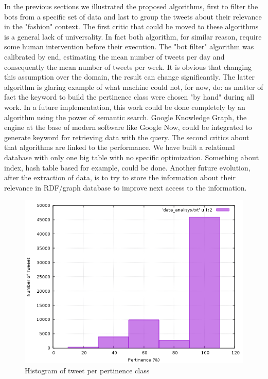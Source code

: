 \documentclass[conference, onecolumn]{IEEEtran}
\begin{document}
In the previous sections we illustrated the proposed algorithms, first to filter the bots from a specific set of data and last to group the tweets about their relevance in the "fashion" context. The first critic that could be moved to these algorithms is a general lack of universality. In fact both algorithm, for similar reason, require some human intervention before their execution. The "bot filter" algorithm was calibrated by end, estimating the mean number of tweets per day and consequently the mean number of tweets per week. It is obvious that changing this assumption over the domain, the result can change significantly. The latter algorithm is glaring example of what machine could not, for now, do: as matter of fact the keyword to build the pertinence class were chosen "by hand" during all work. In a future implementation, this work could be done completely by an algorithm using the power of semantic search. Google Knowledge Graph, the engine at the base of modern software like Google Now, could be integrated to generate keyword for retrieving data with the query. The second critics about that algorithms are linked to the performance. We have built a relational database with only one big table with no specific optimization. Something about index, hash table based for example, could be done. Another future evolution, after the extraction of data, is to try to store the information about their relevance in RDF/graph database to improve next access to the information.
\begin{figure} [!htbp]
	\centering
	\vspace{0.3cm}
	\includegraphics[scale=0.59]{images/hystogram}
	\caption{Histogram of tweet per pertinence class}
	\vspace{0.3cm}
	\label{fig:histogram}
\end{figure}


\end{document}
